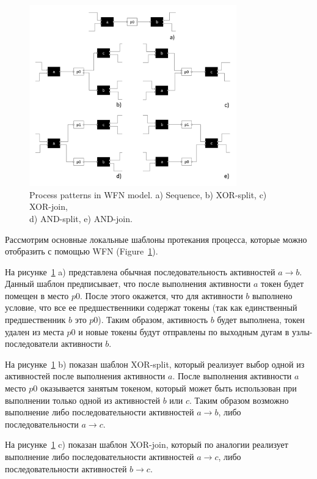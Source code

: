 \documentclass[
11pt,%
tightenlines,%
twoside,%
onecolumn,%
nofloats,%
nobibnotes,%
nofootinbib,%
superscriptaddress,%
noshowpacs,%
centertags]%
{revtex4}
\begin{document}
\begin{figure}[h]
\setcaptionmargin{5mm}
\onelinecaptionsfalse %
\includegraphics[width=0.8\textwidth]{pics/wfn-patterns.pdf}
\caption{Process patterns in WFN model. a) Sequence, b) XOR-split, c) XOR-join,\\d) AND-split, e) AND-join.}
\label{fig:wfn-patterns}
\end{figure}

Рассмотрим основные локальные шаблоны протекания процесса, которые можно отобразить с помощью WFN (Figure~\ref{fig:wfn-patterns}).

На рисунке~\ref{fig:wfn-patterns} a) представлена обычная последовательность активностей $a \rightarrow b$.
Данный шаблон предписывает, что после выполнения активности $a$ токен будет помещен в место $p0$.
После этого окажется, что для активности $b$ выполнено условие, что все ее предшественники содержат токены (так как единственный предшественник $b$ это $p0$).
Таким образом, активность $b$ будет выполнена, токен удален из места $p0$ и новые токены будут отправлены по выходным дугам в узлы-последователи активности $b$.
     
На рисунке~\ref{fig:wfn-patterns} b) показан шаблон XOR-split, который реализует выбор одной из активностей после выполнения активности $a$.
После выполнения активности $a$ место $p0$ оказывается занятым токеном, который может быть использован при выполнении только одной из активностей $b$ или $c$.
Таким образом возможно выполнение либо последовательности активностей $a \rightarrow b$, либо последовательности $a \rightarrow c$.

На рисунке~\ref{fig:wfn-patterns} c) показан шаблон XOR-join, который по аналогии реализует выполнение либо последовательности активностей $a \rightarrow c$, либо последовательности активностей $b \rightarrow c$.
\end{document}
